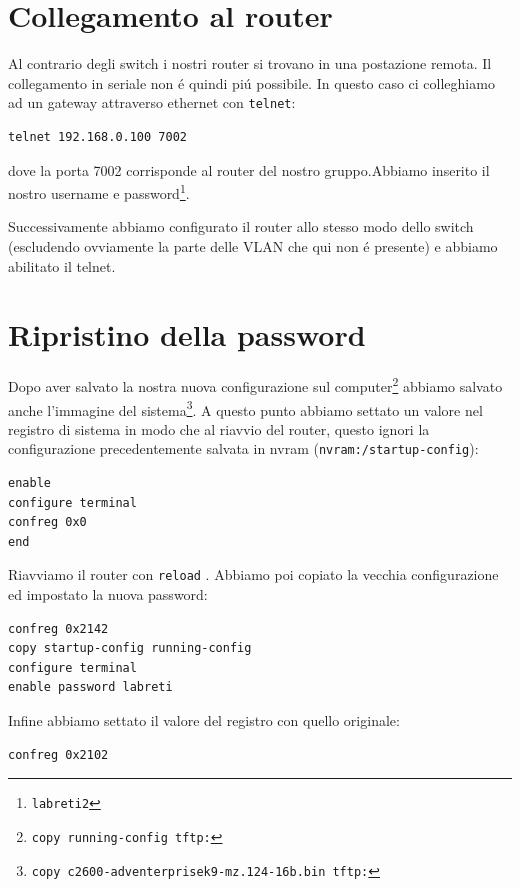 \documentclass[9pt, a4paper, oneside]{article}
\begin{document}
		\section{Collegamento al router}
			\par
				Al contrario degli switch i nostri router si 
				trovano in una postazione remota. Il 
				collegamento in seriale non \'e quindi pi\'u 
				possibile. In questo caso ci colleghiamo ad un 
				gateway attraverso ethernet con \texttt{telnet}:
				\begin{verbatim}
telnet 192.168.0.100 7002
				\end{verbatim}
				dove la porta 7002 corrisponde al router del 
				nostro gruppo.Abbiamo inserito il nostro 
				username e 
				password\footnote{\texttt{labreti2}}.
			\par 
				Successivamente abbiamo configurato il router 
				allo stesso modo dello switch (escludendo 
				ovviamente la parte delle VLAN che qui non \'e 
				presente) e abbiamo abilitato il telnet.
		\section{Ripristino della password}
				Dopo aver salvato la nostra nuova 
				configurazione sul 
				computer\footnote{\texttt{copy 
				running-config tftp:}} abbiamo salvato anche
				l'immagine del sistema\footnote{\texttt{copy 
				c2600-adventerprisek9-mz.124-16b.bin tftp:}}.
				A questo punto abbiamo settato un valore nel 
				registro di sistema in modo che al riavvio del 
				router, questo ignori la configurazione 
				precedentemente salvata in nvram 
				(\texttt{nvram:/startup-config}):
				\begin{verbatim}
enable
configure terminal
confreg 0x0
end
				\end{verbatim}
				Riavviamo il router con \texttt{reload}
				. Abbiamo poi copiato la vecchia configurazione 
				ed impostato la nuova password:
				\begin{verbatim}
confreg 0x2142
copy startup-config running-config
configure terminal
enable password labreti				
				\end{verbatim}
				Infine abbiamo settato il valore del registro 
				con quello originale:
				\begin{verbatim}
confreg 0x2102
				\end{verbatim}
				
\end{document}
